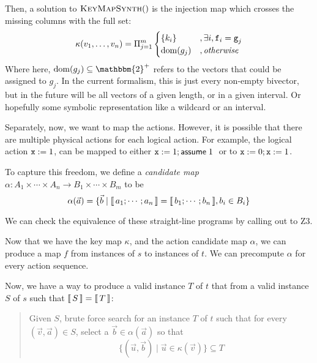Then, a solution to $\textsc{KeyMapSynth}()$ is the injection map which crosses the missing columns with the full set:
\[\displaystyle \kappa (v_1, \ldots, v_n) = \Pi_{j=1}^m \begin{cases}
    \{k_i\} &, \exists i,  \texttt{f}_i = \texttt{g}_j \\
    \mathrm{dom}(g_j) &, \mathit{otherwise}
  \end{cases}
\]
Where here, $\dom(g_j) \subseteq \mathbbm{2}^+$ refers to the vectors
that could be assigned to $g_j$. In the current formalism, this is
just every non-empty bivector, but in the future will be all vectors
of a given length, or in a given interval. Or hopefully some symbolic
representation like a wildcard or an interval.


Separately, now, we want to map the actions. However, it is possible
that there are multiple physical actions for each logical action. For
example, the logical action $\texttt{x}:=1$, can be mapped to either
$\texttt{x} := 1; \mathsf{assume}\; 1\;$ or to $\texttt{x}:= 0; \texttt{x}:= 1$.

To capture this freedom, we define a \emph{candidate map}
$\alpha : A_1 \times \cdots \times A_n \to B_1 \times \cdots \times
B_m$ to be
\[\alpha(\vec a) = \{\vec b \mid \llbracket\,a_1;\cdots;a_n\,\rrbracket =
  \llbracket\,b_1; \cdots; b_n\,\rrbracket, b_i \in B_i  \}\]

We can check the equivalence of these straight-line programs by
calling out to Z3.     

Now that we have the key map $\kappa$, and the action candidate map
$\alpha$, we can produce a map $f$ from instances of $s$ to instances
of $t$. We can precompute $\alpha$ for every action sequence.

Now, we have a way to produce a valid instance $T$ of $t$ that from a
valid instance $S$ of $s$ such that $\llbracket\,S\,\rrbracket = \llbracket\,T\,\rrbracket$:
\begin{quote}
  Given $S$, brute force search for an instance $T$ of $t$ such that
  for every $(\vec v, \vec a) \in S$, select a
  $\vec b \in \alpha(\vec a)$ so that
  \[\{(\vec u, \vec b) \mid \vec u \in
    \kappa(\vec v)\} \subseteq T\]
\end{quote}



